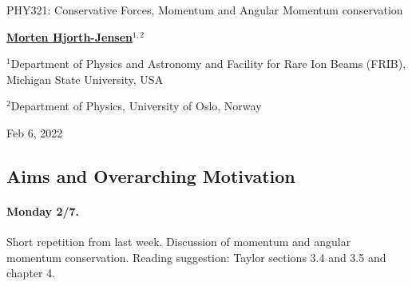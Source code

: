\documentclass[%
oneside,                 %
final,                   %
10pt]{article}
\begin{document}

\newcommand{\exercisesection}[1]{\subsection*{#1}}






\thispagestyle{empty}

\begin{center}
{\LARGE\bf
\begin{spacing}{1.25}
PHY321: Conservative Forces, Momentum and Angular Momentum conservation
\end{spacing}
}
\end{center}


\begin{center}
{\bf \href{{http://mhjgit.github.io/info/doc/web/}}{Morten Hjorth-Jensen}${}^{1, 2}$} \\ [0mm]
\end{center}

\begin{center}
\centerline{{\small ${}^1$Department of Physics and Astronomy and Facility for Rare Ion Beams (FRIB), Michigan State University, USA}}
\centerline{{\small ${}^2$Department of Physics, University of Oslo, Norway}}
\end{center}
    

\begin{center}
Feb 6, 2022
\end{center}

\vspace{1cm}


\subsection{Aims and Overarching Motivation}

\paragraph{Monday 2/7.}
Short repetition from last week. Discussion of momentum and angular momentum conservation.
Reading suggestion: Taylor sections 3.4 and 3.5 and chapter 4.
\end{document}
